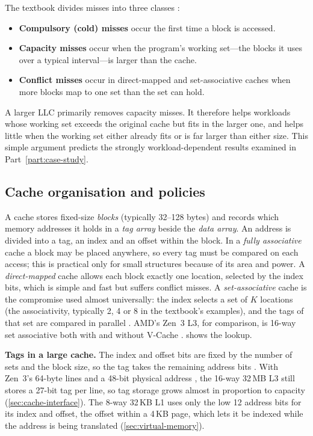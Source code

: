The textbook divides misses into three classes \cite[sec.~11.3.2]{sarangi2025basic}:
\begin{itemize}
  \item \textbf{Compulsory (cold) misses} occur the first time a block is accessed.
  \item \textbf{Capacity misses} occur when the program's working set---the blocks it uses over a typical interval---is larger than the cache.
  \item \textbf{Conflict misses} occur in direct-mapped and set-associative caches when more blocks map to one set than the set can hold.
\end{itemize}
A larger LLC primarily removes capacity misses. It therefore helps workloads whose working set exceeds the original cache but fits in the larger one, and helps little when the working set either already fits or is far larger than either size. This simple argument predicts the strongly workload-dependent results examined in Part~\ref{part:case-study}.

\subsection{Cache organisation and policies}
\label{sec:cache-org}
A cache stores fixed-size \emph{blocks} (typically 32--128 bytes) and records which memory addresses it holds in a \emph{tag array} beside the \emph{data array}. An address is divided into a tag, an index and an offset within the block. In a \emph{fully associative} cache a block may be placed anywhere, so every tag must be compared on each access; this is practical only for small structures because of its area and power. A \emph{direct-mapped} cache allows each block exactly one location, selected by the index bits, which is simple and fast but suffers conflict misses. A \emph{set-associative} cache is the compromise used almost universally: the index selects a set of $K$ locations (the associativity, typically 2, 4 or 8 in the textbook's examples), and the tags of that set are compared in parallel \cite[sec.~11.2.2]{sarangi2025basic}. AMD's Zen~3 L3, for comparison, is 16-way set associative both with and without V-Cache \cite[slides~19--20]{wuu2022vcache}.  shows the lookup.



\textbf{Tags in a large cache.} The index and offset bits are fixed by the number of sets and the block size, so the tag takes the remaining address bits \cite[sec.~11.2.2]{sarangi2025basic}. With Zen~3's 64-byte lines and a 48-bit physical address \cite[p.~10]{advancedmicrodevicesinc.UsingSEVAMD2023}, the 16-way 32\,MB L3 \cite[slide~19]{wuu2022vcache} still stores a 27-bit tag per line, so tag storage grows almost in proportion to capacity (\cref{sec:cache-interface}). The 8-way 32\,KB L1 uses only the low 12 address bits for its index and offset, the offset within a 4\,KB page, which lets it be indexed while the address is being translated (\cref{sec:virtual-memory}).
\label{sec:address-example}


